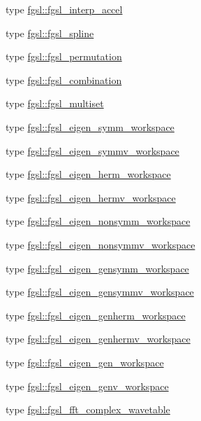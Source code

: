 \begin{DoxyCompactItemize}
type \hyperlink{structfgsl_1_1fgsl__interp__accel}{fgsl\-::fgsl\-\_\-interp\-\_\-accel}
\item 
type \hyperlink{structfgsl_1_1fgsl__spline}{fgsl\-::fgsl\-\_\-spline}
\item 
type \hyperlink{structfgsl_1_1fgsl__permutation}{fgsl\-::fgsl\-\_\-permutation}
\item 
type \hyperlink{structfgsl_1_1fgsl__combination}{fgsl\-::fgsl\-\_\-combination}
\item 
type \hyperlink{structfgsl_1_1fgsl__multiset}{fgsl\-::fgsl\-\_\-multiset}
\item 
type \hyperlink{structfgsl_1_1fgsl__eigen__symm__workspace}{fgsl\-::fgsl\-\_\-eigen\-\_\-symm\-\_\-workspace}
\item 
type \hyperlink{structfgsl_1_1fgsl__eigen__symmv__workspace}{fgsl\-::fgsl\-\_\-eigen\-\_\-symmv\-\_\-workspace}
\item 
type \hyperlink{structfgsl_1_1fgsl__eigen__herm__workspace}{fgsl\-::fgsl\-\_\-eigen\-\_\-herm\-\_\-workspace}
\item 
type \hyperlink{structfgsl_1_1fgsl__eigen__hermv__workspace}{fgsl\-::fgsl\-\_\-eigen\-\_\-hermv\-\_\-workspace}
\item 
type \hyperlink{structfgsl_1_1fgsl__eigen__nonsymm__workspace}{fgsl\-::fgsl\-\_\-eigen\-\_\-nonsymm\-\_\-workspace}
\item 
type \hyperlink{structfgsl_1_1fgsl__eigen__nonsymmv__workspace}{fgsl\-::fgsl\-\_\-eigen\-\_\-nonsymmv\-\_\-workspace}
\item 
type \hyperlink{structfgsl_1_1fgsl__eigen__gensymm__workspace}{fgsl\-::fgsl\-\_\-eigen\-\_\-gensymm\-\_\-workspace}
\item 
type \hyperlink{structfgsl_1_1fgsl__eigen__gensymmv__workspace}{fgsl\-::fgsl\-\_\-eigen\-\_\-gensymmv\-\_\-workspace}
\item 
type \hyperlink{structfgsl_1_1fgsl__eigen__genherm__workspace}{fgsl\-::fgsl\-\_\-eigen\-\_\-genherm\-\_\-workspace}
\item 
type \hyperlink{structfgsl_1_1fgsl__eigen__genhermv__workspace}{fgsl\-::fgsl\-\_\-eigen\-\_\-genhermv\-\_\-workspace}
\item 
type \hyperlink{structfgsl_1_1fgsl__eigen__gen__workspace}{fgsl\-::fgsl\-\_\-eigen\-\_\-gen\-\_\-workspace}
\item 
type \hyperlink{structfgsl_1_1fgsl__eigen__genv__workspace}{fgsl\-::fgsl\-\_\-eigen\-\_\-genv\-\_\-workspace}
\item 
type \hyperlink{structfgsl_1_1fgsl__fft__complex__wavetable}{fgsl\-::fgsl\-\_\-fft\-\_\-complex\-\_\-wavetable}

\end{DoxyCompactItemize}
